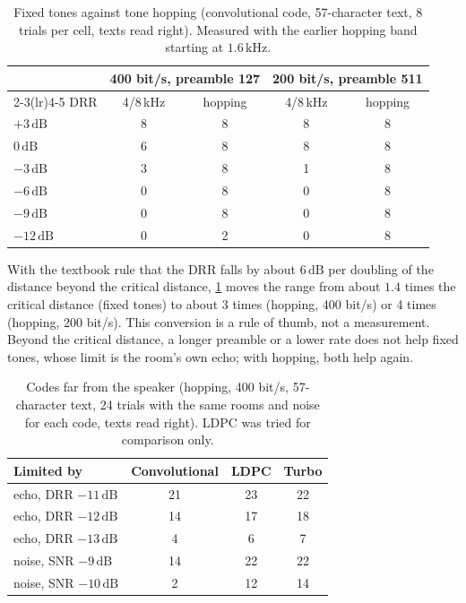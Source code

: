 \documentclass[11pt,a4paper]{article}
\newcommand{\kHz}{\,\mathrm{kHz}}
\newcommand{\dB}{\,\mathrm{dB}}
\theoremstyle{remark}
\begin{document}
\begin{table}[ht]
\centering
\caption{Fixed tones against tone hopping (convolutional code, 57-character text, 8 trials per cell, texts read right). Measured with the earlier hopping band starting at $1.6\kHz$.}
\label{tab:plainhop}
\small
\begin{tabular}{lcccc}
\toprule
& \multicolumn{2}{c}{400 bit/s, preamble 127} & \multicolumn{2}{c}{200 bit/s, preamble 511}\\
\cmidrule(lr){2-3}\cmidrule(lr){4-5}
DRR & 4/8\,kHz & hopping & 4/8\,kHz & hopping\\
\midrule
$+3\dB$ & 8 & 8 & 8 & 8\\
$0\dB$ & 6 & 8 & 8 & 8\\
$-3\dB$ & 3 & 8 & 1 & 8\\
$-6\dB$ & 0 & 8 & 0 & 8\\
$-9\dB$ & 0 & 8 & 0 & 8\\
$-12\dB$ & 0 & 2 & 0 & 8\\
\bottomrule
\end{tabular}
\end{table}
With the textbook rule that the DRR falls by about $6\dB$ per doubling of the distance beyond the critical distance, \cref{tab:plainhop} moves the range from about $1.4$ times the critical distance (fixed tones) to about 3 times (hopping, 400 bit/s) or 4 times (hopping, 200 bit/s). This conversion is a rule of thumb, not a measurement. Beyond the critical distance, a longer preamble or a lower rate does not help fixed tones, whose limit is the room's own echo; with hopping, both help again.

\begin{table}[ht]
\centering
\caption{Codes far from the speaker (hopping, 400 bit/s, 57-character text, 24 trials with the same rooms and noise for each code, texts read right). LDPC was tried for comparison only.}
\label{tab:turbo}
\small
\begin{tabular}{lccc}
\toprule
Limited by & Convolutional & LDPC & Turbo\\
\midrule
echo, DRR $-11\dB$ & 21 & 23 & 22\\
echo, DRR $-12\dB$ & 14 & 17 & 18\\
echo, DRR $-13\dB$ & 4 & 6 & 7\\
noise, SNR $-9\dB$ & 14 & 22 & 22\\
noise, SNR $-10\dB$ & 2 & 12 & 14\\
\bottomrule
\end{tabular}
\end{table}
\end{document}
